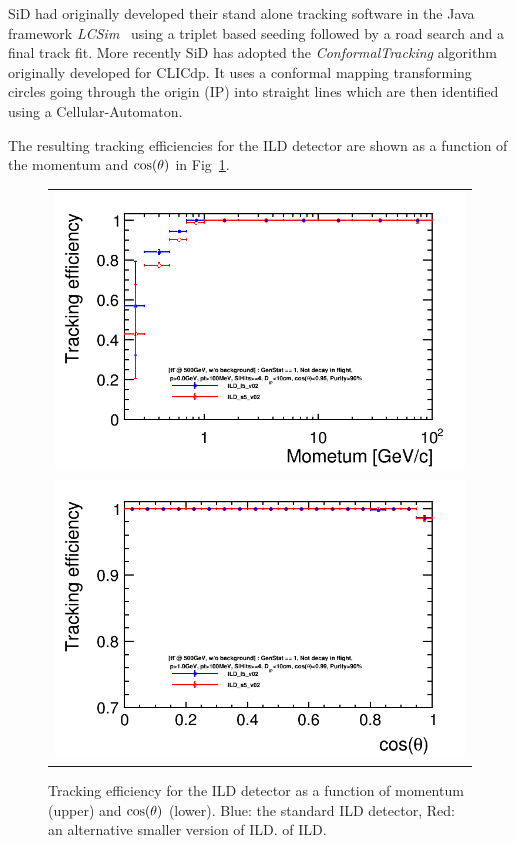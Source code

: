 SiD had originally developed their stand alone tracking software in the Java framework \emph{LCSim}~\cite{bib:LCSim}
using a triplet based seeding followed by a road search and a final track fit. More recently SiD has adopted the \emph{ConformalTracking}
algorithm originally developed for CLICdp. It uses a conformal mapping transforming circles going through the origin (IP)
into straight lines which are then identified using a Cellular-Automaton.



The resulting tracking efficiencies for the ILD detector are shown as a function of the momentum and
$\rm{cos}(\theta)$ in Fig~\ref{fig:ild_trkeff}.

\begin{figure}
  \begin{tabular}[c]{c}
    \includegraphics[width=0.95\hsize]{chapters/figures/trkEff_Momentum_ttbar_ILD_ls5_v02_publish2.png} \\
    \includegraphics[width=0.95\hsize]{chapters/figures/trkEff_theta_ttbar_ILD_ls5_v02_publish1.png}
\end{tabular}
  \caption{Tracking efficiency for the ILD detector as a function of momentum (upper) and $\rm{cos}(\theta)$ (lower).
    Blue: the standard ILD detector, Red: an alternative smaller version of ILD. 
of ILD.}
\label{fig:ild_trkeff}
\end{figure}

